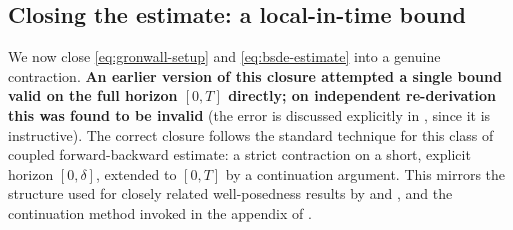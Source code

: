 \documentclass[11pt]{article}
\theoremstyle{remark}
\begin{document}
\subsection{Closing the estimate: a local-in-time bound}
\label{sec:closing-local}

We now close \eqref{eq:gronwall-setup} and \eqref{eq:bsde-estimate} into a genuine
contraction. \textbf{An earlier version of this closure attempted a single bound
valid on the full horizon $[0,T]$ directly; on independent re-derivation this was
found to be invalid} (the error is discussed explicitly in , since
it is instructive). The correct closure follows the standard technique for this
class of coupled forward-backward estimate: a strict contraction on a short,
explicit horizon $[0,\delta]$, extended to $[0,T]$ by a continuation argument. This
mirrors the structure used for closely related well-posedness results by
\citet{ahuja2016} and \citet{qiao2025}, and the continuation method invoked in the
appendix of \citet{jacksontangpi2024}.
\end{document}
